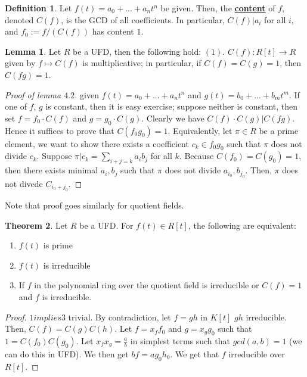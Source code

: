 \documentclass{article}
\theoremstyle{definition}
\newtheorem{theorem}{Theorem}[section]
\theoremstyle{definition}
\theoremstyle{definition}
\theoremstyle{definition}
\newtheorem{lemma}[theorem]{Lemma}
\theoremstyle{definition}
\newtheorem{definition}{Definition}[section]
\theoremstyle{definition}
\theoremstyle{definition}
\begin{document}
\begin{tcolorbox}[colback=purple!5!white,colframe=purple!75!black]
\begin{definition}
    Let $f(t)=a_0+...+a_nt^n$ be given. Then, the \underline{\textbf{content}} of $f$, denoted $C(f)$, is the GCD of all coefficients. In particular, $C(f)|a_i$ for all $i$, and $f_0:=f/(C(f))$ has content $1$. 
\end{definition}
\end{tcolorbox}


\begin{tcolorbox}
\begin{lemma}
    Let $R$ be a UFD, then the following hold: $(1).$ $C(f): R[t]\to R$ given by $f\mapsto C(f)$ is multiplicative; in particular, if $C(f)=C(g)=1$, then $C(fg)=1$. 
\end{lemma}
\end{tcolorbox}

\begin{proof}[Proof of lemma $4.2$]
 given $f(t)=a_0+...+a_nt^n$ and $g(t)=b_0+...+b_mt^m$. If one of $f$, $g$ is constant, then it is easy exercise; suppose neither is constant, then set $f=f_0\cdot C(f)$ and $g=g_0\cdot C(g)$. Clearly we have $C(f)\cdot C(g)| C(fg)$. Hence it suffices to prove that $C(f_0g_0)=1$. Equivalently, let $\pi\in R$ be a prime element, we want to show there exists a coefficient $c_k\in f_0g_0$ such that $\pi$ does not divide $c_k$. Suppose $\pi| c_k=\sum_{i+j=k}a_ib_j$ for all $k$. Because $C(f_0)=C(g_0)=1$, then there exists minimal $a_i,b_j$ such that $\pi$ does not divide $a_{i_0},b_{j_0}$. Then, $\pi$ does not divede $C_{i_0+j_0}$.

\end{proof}
Note that proof goes similarly for quotient fields. 

\begin{tcolorbox}[colback=red!5!white,colframe=red!30!white]
\begin{theorem}
    Let $R$ be a UFD. For $f(t)\in R[t]$, the following are equivalent: 
    \begin{enumerate}
        \item $f(t)$ is prime
        \item  $f(t)$ is irreducible
        \item  If $f$ in the polynomial ring over the quotient field is irreducible or $C(f)=1$ and $f$ is irreducible. 
    \end{enumerate} 
\end{theorem}
\end{tcolorbox}
\begin{proof}
    $1 implies 3$ trivial. By contradiction, let $f=gh$ in $K[t]$ $gh$ irreducible. Then, $C(f)=C(g)C(h)$. Let $f=x_ff_0$ and $g=x_gg_0$ such that  $1=C(f_0)C(g_0)$. Let $x_fx_g=\frac{a}{b}$ in simplest terms such that $gcd(a,b)=1$ (we can do this in UFD). We then get $bf=ag_0h_0$. We get that $f$ irreducible over $R[t]$.
\end{proof}
 
\end{document}
